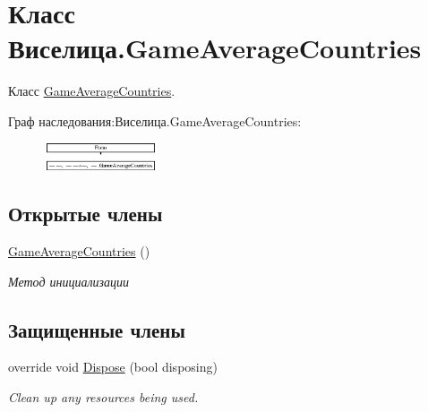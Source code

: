 \hypertarget{class_xD0_x92_xD0_xB8_xD1_x81_xD0_xB5_xD0_xBB_xD0_xB8_xD1_x86_xD0_xB0_1_1_game_average_countries}{\section{Класс Виселица.\+Game\+Average\+Countries}
\label{class_xD0_x92_xD0_xB8_xD1_x81_xD0_xB5_xD0_xBB_xD0_xB8_xD1_x86_xD0_xB0_1_1_game_average_countries}
}


Класс \hyperlink{class_xD0_x92_xD0_xB8_xD1_x81_xD0_xB5_xD0_xBB_xD0_xB8_xD1_x86_xD0_xB0_1_1_game_average_countries}{Game\+Average\+Countries}.  


Граф наследования\+:Виселица.\+Game\+Average\+Countries\+:\begin{figure}[H]
\begin{center}
\leavevmode
\includegraphics[height=0.811594cm]{class_xD0_x92_xD0_xB8_xD1_x81_xD0_xB5_xD0_xBB_xD0_xB8_xD1_x86_xD0_xB0_1_1_game_average_countries}
\end{center}
\end{figure}
\subsection*{Открытые члены}
\begin{DoxyCompactItemize}
\item 
\hyperlink{class_xD0_x92_xD0_xB8_xD1_x81_xD0_xB5_xD0_xBB_xD0_xB8_xD1_x86_xD0_xB0_1_1_game_average_countries_a686c439b5f74cee1da56f04ecbd507ea}{Game\+Average\+Countries} ()
\begin{DoxyCompactList}\small\item\em Метод инициализации \end{DoxyCompactList}\end{DoxyCompactItemize}
\subsection*{Защищенные члены}
\begin{DoxyCompactItemize}
\item 
override void \hyperlink{class_xD0_x92_xD0_xB8_xD1_x81_xD0_xB5_xD0_xBB_xD0_xB8_xD1_x86_xD0_xB0_1_1_game_average_countries_a5cbc95f48e9310b5b91ac2585a11467a}{Dispose} (bool disposing)
\begin{DoxyCompactList}\small\item\em Clean up any resources being used. \end{DoxyCompactList}\end{DoxyCompactItemize}


